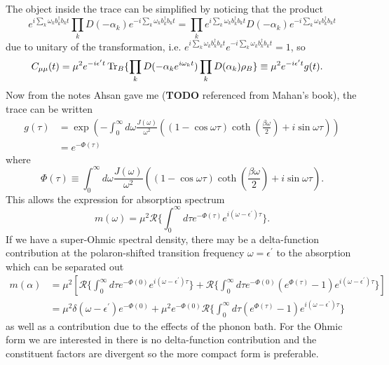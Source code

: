 \documentclass[]{article}
\begin{document}
The object inside the trace can be simplified by noticing that the product
\begin{equation}
e^{ i\sum_k \omega_k b_k^{\dagger}b_k t} \prod_k D(- \alpha_k) e^{- i\sum_k \omega_k b_k^{\dagger}b_k t} = \prod_k e^{ i\sum_k \omega_k b_k^{\dagger}b_k t} D(- \alpha_k) e^{- i\sum_k \omega_k b_k^{\dagger}b_k t}
\end{equation}
due to unitary of the transformation, i.e. $  e^{i\sum_k \omega_k b_k^{\dagger}b_k t} e^{- i\sum_k \omega_k b_k^{\dagger}b_k t}=1$, so
\begin{equation}
\begin{split}
C_{\mu \mu}(t) &=  \mu^2 e^{- i \epsilon^{\prime}t}\Tr_{B}\{\prod_k D(- \alpha_k e^{i\omega_k t})  \prod_k D(\alpha_k)\rho_{B} \} \equiv \mu^2 e^{- i \epsilon^{\prime}t}g(t).
\end{split}
\end{equation}
Now from the notes Ahsan gave me (\textbf{TODO} referenced from Mahan's book), the trace can be written
\begin{equation}
\begin{split}
g(\tau) &= \exp(-\int_{0}^{\infty}d\omega \frac{J(\omega)}{\omega^2}((1-\cos\omega\tau)\coth(\frac{\beta\omega}{2})+i\sin\omega\tau)) \\
&=  e^{-\Phi(\tau)}
\end{split}
\end{equation}
where 
\begin{equation}
\Phi(\tau) \equiv \int_{0}^{\infty}d\omega\frac{J(\omega)}{\omega^2}((1-\cos\omega\tau)\coth(\frac{\beta\omega}{2})+i\sin\omega\tau).
\end{equation}
This allows the expression for absorption spectrum
\begin{equation}
m(\omega) = \mu^2\mathcal{R}\{\int_{0}^{\infty}d\tau e^{-\Phi(\tau)} e^{i(\omega-\epsilon^{\prime})\tau}\}.
\end{equation}
If we have a super-Ohmic spectral density, there may be a delta-function contribution at the polaron-shifted transition frequency $\omega=\epsilon^{\prime}$ to the absorption which can be separated out
\begin{equation}
\begin{split}
m(\alpha) &= \mu^2\left[\mathcal{R}\{\int_{0}^{\infty}d\tau e^{-\Phi(0)} e^{i(\omega-\epsilon^{\prime})\tau}\} + \mathcal{R}\{\int_{0}^{\infty}d\tau e^{-\Phi(0)}(e^{\Phi(\tau)}-1) e^{i(\omega-\epsilon^{\prime})\tau}\} \right] \\
&= \mu^2\delta(\omega-\epsilon^{\prime}) e^{-\Phi(0)}  + \mu^2 e^{-\Phi(0)}\mathcal{R}\{\int_{0}^{\infty}d\tau  (e^{\Phi(\tau)}-1)e^{i(\omega-\epsilon^{\prime})\tau}\}
\end{split}
\end{equation}
as well as a contribution due to the effects of the phonon bath. For the Ohmic form we are interested in there is no delta-function contribution and the constituent factors are divergent so the more compact form is preferable.
\end{document}

